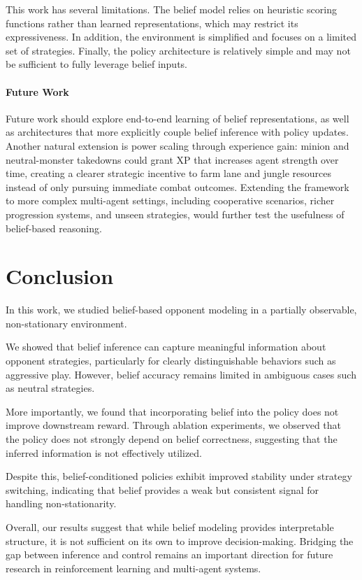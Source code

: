 \documentclass{article}
\begin{document}
This work has several limitations. 
The belief model relies on heuristic scoring functions rather than learned representations, 
which may restrict its expressiveness. 
In addition, the environment is simplified and focuses on a limited set of strategies. 
Finally, the policy architecture is relatively simple and may not be sufficient to fully leverage belief inputs.

\paragraph{Future Work}

Future work should explore end-to-end learning of belief representations, 
as well as architectures that more explicitly couple belief inference with policy updates. Another natural extension is power scaling through experience gain: minion and neutral-monster takedowns could grant XP that increases agent strength over time, creating a clearer strategic incentive to farm lane and jungle resources instead of only pursuing immediate combat outcomes. 
Extending the framework to more complex multi-agent settings, including cooperative scenarios, richer progression systems, and unseen strategies, 
would further test the usefulness of belief-based reasoning.

\section{Conclusion}

In this work, we studied belief-based opponent modeling in a partially observable, non-stationary environment.

We showed that belief inference can capture meaningful information about opponent strategies, 
particularly for clearly distinguishable behaviors such as aggressive play. 
However, belief accuracy remains limited in ambiguous cases such as neutral strategies.

More importantly, we found that incorporating belief into the policy does not improve downstream reward. 
Through ablation experiments, we observed that the policy does not strongly depend on belief correctness, 
suggesting that the inferred information is not effectively utilized.

Despite this, belief-conditioned policies exhibit improved stability under strategy switching, 
indicating that belief provides a weak but consistent signal for handling non-stationarity.

Overall, our results suggest that while belief modeling provides interpretable structure, 
it is not sufficient on its own to improve decision-making. 
Bridging the gap between inference and control remains an important direction for future research in reinforcement learning and multi-agent systems.

\FloatBarrier

\newpage


\end{document}
